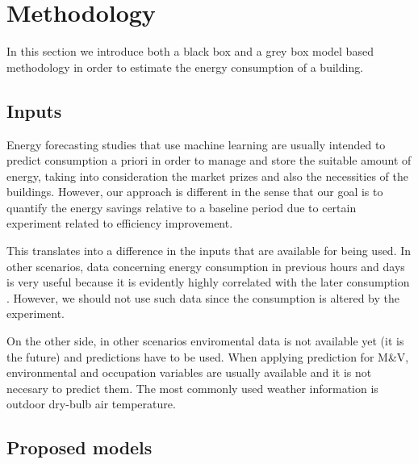 \documentclass[10pt, conference, compsocconf]{IEEEtran}
\begin{document}




\section{Methodology}

In this section we introduce both a black box and a grey box model based methodology in order to estimate the energy consumption of a building.

\subsection{Inputs}


Energy forecasting studies that use machine learning are usually intended to predict consumption a priori in order to manage and store the suitable amount of energy, taking into consideration the market prizes and also the necessities of the buildings. However, our approach is different in the sense that our goal is to quantify the energy savings relative to a baseline period due to certain experiment related to efficiency improvement. 

This translates into a difference in the inputs that are available for being used. In other scenarios, data concerning energy consumption in previous hours and days is very useful because it is evidently highly correlated with the later consumption \cite{aman2014empirical}. However, we should not use such data since the consumption is altered by the experiment.

On the other side, in other scenarios enviromental data is not available yet (it is the future) and predictions have to be used. When applying prediction for M\&V, environmental and occupation variables are usually available and it is not necesary to predict them. The most commonly used weather information is outdoor dry-bulb air temperature.



\subsection{Proposed models}
\end{document}

